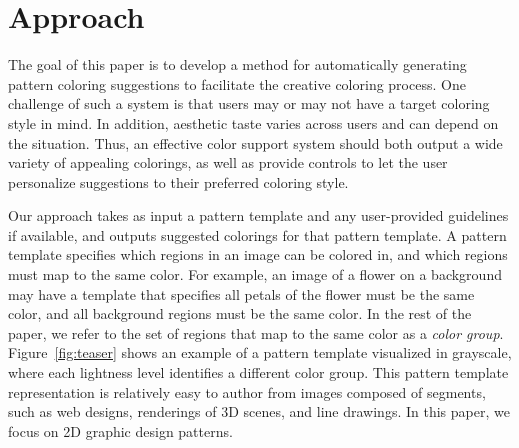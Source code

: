 \section{Approach}
\label{sec:approach}


The goal of this paper is to develop a method for automatically generating pattern coloring suggestions to facilitate the creative coloring process. One challenge of such a system is that users may or may not have a target coloring style in mind. In addition, aesthetic taste varies across users and can depend on the situation. Thus, an effective color support system should both output a wide variety of appealing colorings, as well as provide controls to let the user personalize suggestions to their preferred coloring style.


Our approach takes as input a pattern template and any user-provided guidelines if available, and outputs suggested colorings for that pattern template. A pattern template specifies which regions in an image can be colored in, and which regions must map to the same color. For example, an image of a flower on a background may have a template that specifies all petals of the flower must be the same color, and all background regions must be the same color. In the rest of the paper, we refer to the set of regions that map to the same color as a \emph{color group}. Figure~\ref{fig:teaser} shows an example of a pattern template visualized in grayscale, where each lightness level identifies a different color group. This pattern template representation is relatively easy to author from images composed of segments, such as web designs, renderings of 3D scenes, and line drawings. In this paper, we focus on 2D graphic design patterns. 

